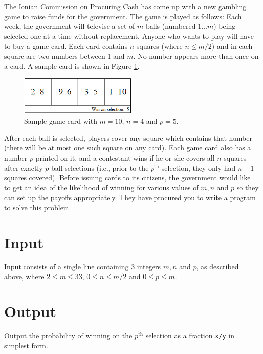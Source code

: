 The Ionian Commission on Procuring Cash has come up with a new gambling game to raise funds for the government. The game is played as follows: Each week, the government will televise a set of $m$ balls (numbered $1 \ldots m$) being selected one at a time without replacement. Anyone who wants to play will have to buy a game card. Each card contains $n$ squares (where $n \leq m/2$) and in each square are two numbers between 1 and $m$. No number appears more than once on a card. A sample card is shown in Figure \ref{fig:card}.
\begin{figure}[!h]
\centering
\includegraphics[width=0.5\textwidth]{gamecard}
\caption{Sample game card with $m=10$, $n=4$ and $p=5$.}
\label{fig:card}
\end{figure}

After each ball is selected, players cover any square which contains that number (there will be at most one such square on any card). Each game card also has a number $p$ printed on it, and a contestant wins if he or she covers all $n$ squares after exactly $p$ ball selections (i.e., prior to the $p^{\text{th}}$ selection, they only had $n-1$ squares covered). Before issuing cards to its citizens, the government would like to get an idea of the likelihood of winning for various values of $m, n$ and $p$ so they can set up the payoffs appropriately. They have procured you to write a program to solve this problem.

\section*{Input}
Input consists of a single line containing 3 integers $m, n$ and $p$, as described above, where $2 \leq m \leq 33$, $0 \leq n \leq m/2$ and $0 \leq p \leq m$.

\section*{Output}
Output the probability of winning on the $p^{\text{th}}$ selection as a fraction {\tt x/y} in simplest form. 
